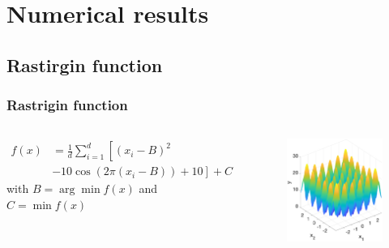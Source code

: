 \documentclass[aspectratio=169]{beamer}
\begin{document}
\section{Numerical results}
\subsection{Rastirgin function}
\begin{frame}
	\frametitle{Rastrigin function}
\begin{columns}
\begin{equation*}
\begin{aligned}
		f(x) &= \frac{1}{d} \sum_{i=1}^d \left[(x_i-B)^2 \right.\\
		 &\left.-10\cos(2\pi (x_i-B)) + 10\right] + C
\end{aligned}
\end{equation*}
with $B = \arg \min f(x)$ and $C= \min f(x)$ 
\begin{figure}[ht]
	\centering
	\includegraphics[width=1.1\linewidth]{Figure/R_function}
	\end{figure}
\end{columns}
\end{frame}
\end{document}

